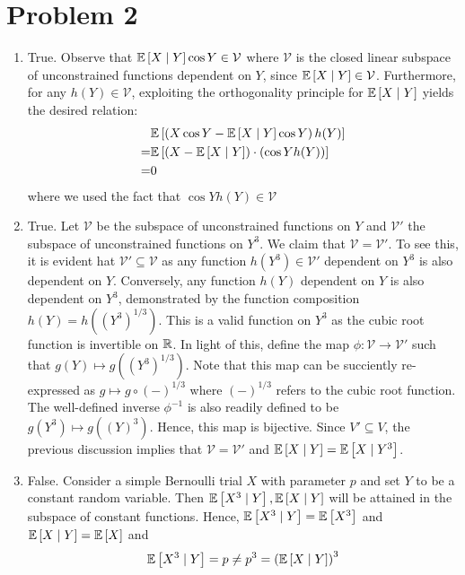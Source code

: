 \documentclass[12pt]{article}%
\begin{document}
\section{Problem 2}
\begin{enumerate}
  \item True. Observe that $\mathbb{E}\left[{X}\mid {Y}\right]\cos{Y} \in \mathcal{V}$ where $\mathcal{V}$ is the closed linear subspace of unconstrained functions dependent on $Y$, since $\mathbb{E}\left[{X}\mid {Y}\right] \in \mathcal{V}$. Furthermore, for any $h(Y) \in \mathcal{V}$, exploiting the orthogonality principle for $\mathbb{E}\left[{X}\mid {Y}\right]$ yields the desired relation:
  \begin{align*}
  &   \mathbb{E}\left[\left(X\cos{Y} - \mathbb{E}\left[{X}\mid {Y}\right]\cos{Y}\right)h(Y)\right] \\
    = & \mathbb{E}\left[(X - \mathbb{E}\left[{X}\mid {Y}\right])\cdot(\cos{Y} h(Y))\right] \\
    = & 0
  \end{align*}
  where we used the fact that $\cos{Y} h(Y) \in \mathcal{V}$

  \item
  True. Let $\mathcal{V}$ be the subspace of unconstrained functions on $Y$ and $\mathcal{V}'$ the subspace of unconstrained functions on $Y^3$. We claim that $\mathcal{V} = \mathcal{V}'$. To see this, it is evident hat $\mathcal{V}' \subseteq \mathcal{V}$ as any function $h(Y^3) \in \mathcal{V}'$ dependent on $Y^3$ is also dependent on $Y$. Conversely, any function $h(Y)$ dependent on $Y$ is also dependent on $Y^3$, demonstrated by the function composition $h(Y) = h((Y^3)^{1/3})$. This is a valid function on $Y^3$ as the cubic root function is invertible on ${\mathbb{R}}$. In light of this, define the map $\phi: \mathcal{V} \rightarrow \mathcal{V'}$ such that $g(Y) \mapsto g((Y^3)^{1/3})$. Note that this map can be succiently re-expressed as $g \mapsto g \circ (-)^{1/3}$ where $(-)^{1/3}$ refers to the cubic root function. The well-defined inverse $\phi^{-1}$ is also readily defined to be $g(Y^3) \mapsto g((Y)^3)$. Hence, this map is bijective. Since $V' \subseteq V$, the previous discussion implies that $\mathcal{V} = \mathcal{V}'$ and $\mathbb{E}\left[{X}\mid {Y}\right] = \mathbb{E}\left[{X}\mid {Y^3}\right]$.

  \item
  False. Consider a simple Bernoulli trial $X$ with parameter $p$ and set $Y$ to be a constant random variable. Then $\mathbb{E}\left[{X^3}\mid {Y}\right],\mathbb{E}\left[{X}\mid {Y}\right]$ will be attained in the subspace of constant functions. Hence, $\mathbb{E}\left[{X^3}\mid {Y}\right] = \mathbb{E}\left[X^3\right]$ and $\mathbb{E}\left[{X}\mid {Y}\right] = \mathbb{E}\left[X\right]$ and
  \[\mathbb{E}\left[{X^3}\mid {Y}\right] = p \neq p^3 = \left(\mathbb{E}\left[{X}\mid {Y}\right]\right)^3 \]


\end{enumerate}
\end{document}
